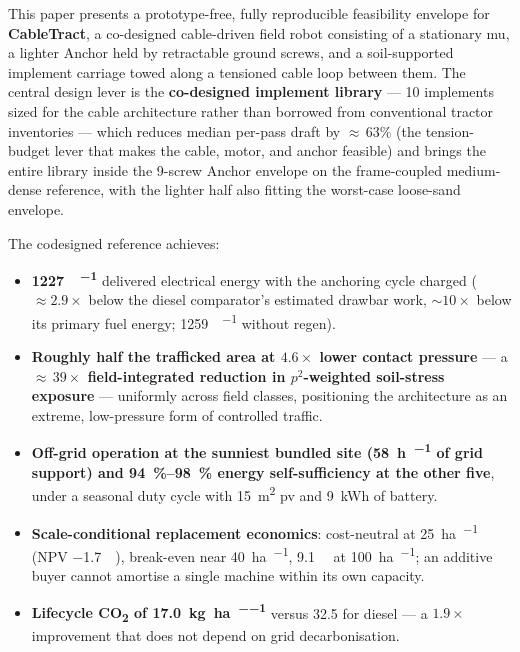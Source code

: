 \documentclass[11pt,a4paper]{article}
\begin{document}
This paper presents a prototype-free, fully reproducible feasibility envelope for \textbf{CableTract}, a co-designed cable-driven field robot consisting of a stationary \gls{mu}, a lighter Anchor held by retractable ground screws, and a soil-supported implement carriage towed along a tensioned cable loop between them. The central design lever is the \textbf{co-designed implement library} --- 10 implements sized for the cable architecture rather than borrowed from conventional tractor inventories --- which reduces median per-pass draft by ${\approx}\,63\%$ (the tension-budget lever that makes the cable, motor, and anchor feasible) and brings the entire library inside the 9-screw Anchor envelope on the frame-coupled medium-dense reference, with the lighter half also fitting the worst-case loose-sand envelope.

The codesigned reference achieves:

\begin{itemize}[leftmargin=1.6em,itemsep=0.15em]
    \item \textbf{\SI{1227}{\Wh\per\decare}} delivered electrical energy with the anchoring cycle charged (${\approx}2.9\times$ below the diesel comparator's estimated drawbar work, ${\sim}10\times$ below its primary fuel energy; \SI{1259}{\Wh\per\decare} without regen).
    \item \textbf{Roughly half the trafficked area at $4.6\times$ lower contact pressure} --- a \textbf{${\approx}\,39\times$ field-integrated reduction in $p^2$-weighted soil-stress exposure} --- uniformly across field classes, positioning the architecture as an extreme, low-pressure form of controlled traffic.
    \item \textbf{Off-grid operation at the sunniest bundled site (\SI{58}{\hour\per\year} of grid support) and \SIrange{94}{98}{\percent} energy self-sufficiency at the other five}, under a seasonal duty cycle with \SI{15}{\meter\squared} \gls{pv} and \SI{9}{\kWh} of battery.
    \item \textbf{Scale-conditional replacement economics}: cost-neutral at \SI{25}{\hectare\per\year} (NPV \SI{-1.7}{\kilo\EUR}), break-even near \SI{40}{\hectare\per\year}, \SI{+9.1}{\kilo\EUR} at \SI{100}{\hectare\per\year}; an additive buyer cannot amortise a single machine within its own capacity.
    \item \textbf{Lifecycle CO\textsubscript{2} of \SI{17.0}{\kilogram\per\hectare\per\year}} versus 32.5 for diesel --- a $1.9\times$ improvement that does not depend on grid decarbonisation.
\end{itemize}
\end{document}
